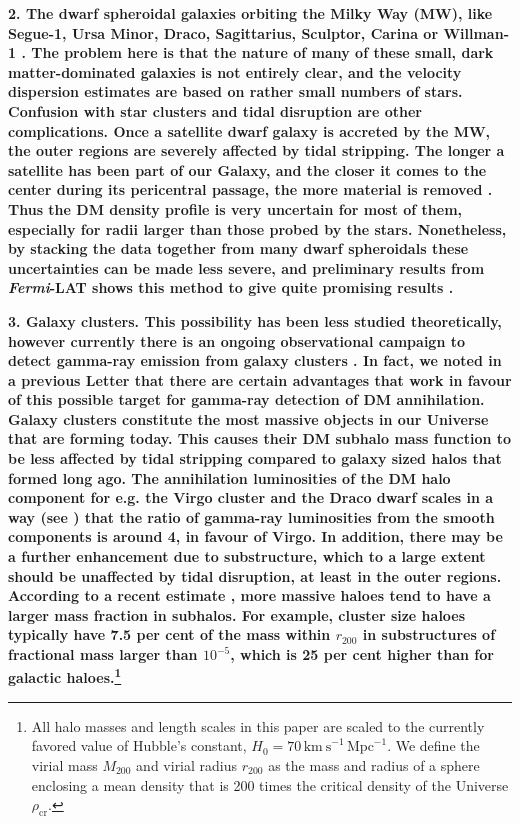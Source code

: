 \documentclass[10pt,aps,pra,reprint,amsmath,amsfonts,amssymb,showpacs,nofootinbib,floatfix]{revtex4-1}
\def\C#1{{\bf #1}}
\newcommand{\Fermi}{{\em Fermi}\xspace}
\newcommand{\rmn}{\mathrm}
\newcommand{\rvir}{r_{200}}
\newcommand{\mvir}{M_{200}}
\begin{document}
\C{2. The dwarf spheroidal galaxies orbiting the Milky Way (MW), like
  Segue-1, Ursa Minor, Draco, Sagittarius, Sculptor, Carina or
  Willman-1
  \cite{2009JCAP...01..016B,2010ApJ...720.1174A,2010JCAP...01..031S,2010JCAP...01..031S,2011arXiv1103.0477T,2011APh....34..608H}. The
  problem here is that the nature of many of these small, dark
  matter-dominated galaxies is not entirely clear, and the velocity
  dispersion estimates are based on rather small numbers of stars.
  Confusion with star clusters and tidal disruption are other
  complications. Once a satellite dwarf galaxy is accreted by the MW,
  the outer regions are severely affected by tidal stripping. The
  longer a satellite has been part of our Galaxy, and the closer it
  comes to the center during its pericentral passage, the more
  material is removed \cite{2004MNRAS.355..819G}.  Thus the DM density
  profile is very uncertain for most of them, especially for radii
  larger than those probed by the stars. Nonetheless, by stacking the
  data together from many dwarf spheroidals these uncertainties can be
  made less severe, and preliminary results from \Fermi-LAT shows this
  method to give quite promising results \cite{garde}.}

\C{3. Galaxy clusters. This possibility has been less studied
  theoretically, however currently there is an ongoing observational
  campaign to detect gamma-ray emission from galaxy clusters
  \cite{2003ApJ...588..155R,2006ApJ...644..148P,2008AIPC.1085..569P,2009A&A...495...27A,2009arXiv0907.5000G,2009IJMPD..18.1627D,2009A&A...495...27A,2009A&A...502..437A,2009ApJ...704..240K,2009ApJ...706L.275A,2010ApJ...710..634A,2010JCAP...05..025A,2010ApJ...717L..71A}.
  In fact, we noted in a previous Letter \cite{2009PhRvL.103r1302P}
  that there are certain advantages that work in favour of this
  possible target for gamma-ray detection of DM annihilation. Galaxy
  clusters constitute the most massive objects in our Universe that
  are forming today. This causes their DM subhalo mass function to be
  less affected by tidal stripping compared to galaxy sized halos that
  formed long ago. The annihilation luminosities of the DM halo
  component for e.g. the Virgo cluster and the Draco dwarf scales in a
  way (see \cite{2009PhRvL.103r1302P}) that the ratio of gamma-ray
  luminosities from the smooth components is around 4, in favour of
  Virgo. In addition, there may be a further enhancement due to
  substructure, which to a large extent should be unaffected by tidal
  disruption, at least in the outer regions. According to a recent
  estimate \cite{2011MNRAS.410.2309G}, more massive haloes tend to
  have a larger mass fraction in subhalos. For example, cluster size
  haloes typically have 7.5 per cent of the mass within $r_{200}$ in
  substructures of fractional mass larger than $10^{-5}$, which is 25
  per cent higher than for galactic haloes.\footnote{All halo masses
    and length scales in this paper are scaled to the currently
    favored value of Hubble's constant, $H_0 = 70\,
    \rmn{km~s}^{-1}\,\rmn{Mpc}^{-1}$. We define the virial mass
    $\mvir$ and virial radius $\rvir$ as the mass and radius of a
    sphere enclosing a mean density that is 200 times the critical
    density of the Universe $\rho_{\rmn{cr}}$.}}
\end{document}
